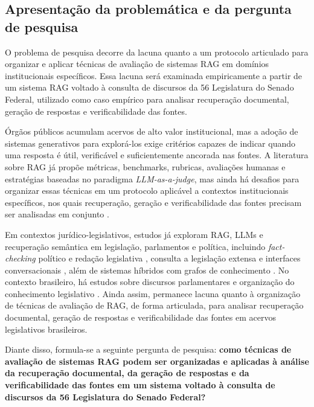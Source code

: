 \subsection{Apresentação da problemática e da pergunta de pesquisa}

O problema de pesquisa decorre da lacuna quanto a um protocolo articulado para organizar e aplicar técnicas de avaliação de sistemas RAG em domínios institucionais específicos. Essa lacuna será examinada empiricamente a partir de um sistema RAG voltado à consulta de discursos da 56\textordfeminine{} Legislatura do Senado Federal, utilizado como caso empírico para analisar recuperação documental, geração de respostas e verificabilidade das fontes.

Órgãos públicos acumulam acervos de alto valor institucional, mas a adoção de sistemas generativos para explorá-los exige critérios capazes de indicar quando uma resposta é útil, verificável e suficientemente ancorada nas fontes. A literatura sobre RAG já propõe métricas, benchmarks, rubricas, avaliações humanas e estratégias baseadas no paradigma \textit{LLM-as-a-judge}, mas ainda há desafios para organizar essas técnicas em um protocolo aplicável a contextos institucionais específicos, nos quais recuperação, geração e verificabilidade das fontes precisam ser analisadas em conjunto \parencite{gao2023ragSurvey,esEtAl2023ragas,saadFalconEtAl2024ares,liuEtAl2025judgeRag}.

Em contextos jurídico-legislativos, estudos já exploram RAG, LLMs e recuperação semântica em legislação, parlamentos e política, incluindo \textit{fact-checking} político e redação legislativa \parencite{khaliq2024ragar,chouhanGertz2024lexdrafter}, consulta a legislação extensa e interfaces conversacionais \parencite{garrisonEtAl2024talkNdaa,rogiersEtAl2024kamerraad,matoshiEtAl2025parliamentRag}, além de sistemas híbridos com grafos de conhecimento \parencite{colomboEtAl2025legisSearch,mosbachEtAl2025worldAvatarParliament}. No contexto brasileiro, há estudos sobre discursos parlamentares e organização do conhecimento legislativo \parencite{blanco2025plenarioPalanqueEstudio,blanco2026letrasGraudas,martelloteViola2025organizacaoConhecimento}. Ainda assim, permanece lacuna quanto à organização de técnicas de avaliação de RAG, de forma articulada, para analisar recuperação documental, geração de respostas e verificabilidade das fontes em acervos legislativos brasileiros.

Diante disso, formula-se a seguinte pergunta de pesquisa: \textbf{como técnicas de avaliação de sistemas RAG podem ser organizadas e aplicadas à análise da recuperação documental, da geração de respostas e da verificabilidade das fontes em um sistema voltado à consulta de discursos da 56\textordfeminine{} Legislatura do Senado Federal?}

